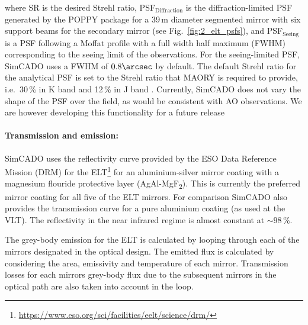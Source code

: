 where SR is the desired Strehl ratio, PSF$_{\mathrm{Diffraction}}$ is the diffraction-limited PSF generated by the POPPY package \citep{poppy} for a 39\,m diameter segmented mirror with six support beams for the secondary mirror (see Fig.~\ref{fig:2_elt_psfs}), and PSF$_{\mathrm{Seeing}}$ is a PSF following a Moffat profile with a full width half maximum (FWHM) corresponding to the seeing limit of the observations. For the seeing-limited PSF, SimCADO uses a FWHM  of $0.8\arcsec$ by default. The default Strehl ratio for the analytical PSF is set to the Strehl ratio that MAORY is required to provide, i.e.\ 30\,\% in K band and 12\,\% in J band \citep{maory2016}. Currently, SimCADO does not vary the shape of the PSF over the field, as would be consistent with AO observations. We are however developing this functionality for a future release


\paragraph{Transmission and emission:} SimCADO uses the reflectivity curve provided by the ESO Data Reference Mission (DRM) for the ELT\footnote{\url{https://www.eso.org/sci/facilities/eelt/science/drm/}} for an aluminium-silver mirror coating with a magnesium flouride protective layer (AgAl-MgF\textsubscript{2}). This is currently the preferred mirror coating for all five of the ELT mirrors. For comparison SimCADO also provides the transmission curve for a pure aluminium coating (as used at the VLT). The reflectivity in the near infrared regime is almost constant at $\sim 98\,\%$.

The grey-body emission  for the ELT is calculated by looping through each of the mirrors designated in the optical design. The emitted flux is calculated by considering the area, emissivity and temperature of each mirror. Transmission losses for each mirrors grey-body flux due to the subsequent mirrors in the optical path are also taken into account in the loop.



